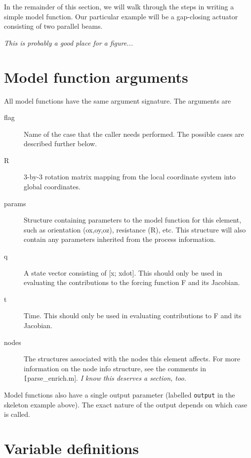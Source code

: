 In the remainder of this section, we will walk through the steps in
writing a simple model function.  Our particular example will be a
gap-closing actuator consisting of two parallel beams.

\emph{This is probably a good place for a figure...}


\section{Model function arguments}

All model functions have the same argument signature.  The arguments
are
\begin{description}

\item[flag] Name of the case that the caller needs performed.
 The possible cases are described further below.

\item[R] 3-by-3 rotation matrix mapping from the local coordinate system
 into global coordinates.

\item[params] Structure containing parameters to the model function for this
 element, such as orientation (ox,oy,oz), resistance (R), etc.  This
 structure will also contain any parameters inherited from the process
 information.

\item[q] A state vector consisting of [x; xdot].  This should only be used 
 in evaluating the contributions to the forcing function F and its Jacobian.

\item[t] Time.  This should only be used in evaluating contributions to F 
  and its Jacobian.

\item[nodes] The structures associated with the nodes this element affects.
  For more information on the node info structure, see the comments
  in \texttt[parse\_enrich.m].  \emph{I know this deserves a section, too.}

\end{description}

Model functions also have a single output parameter (labelled \texttt{output}
in the skeleton example above).  The exact nature of the output depends on
which case is called.


\section{Variable definitions}

